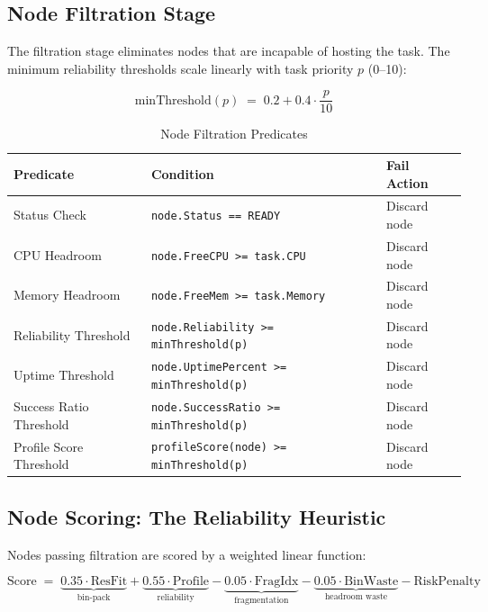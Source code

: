 \documentclass[11pt,a4paper]{article}
\begin{document}
\subsection{Node Filtration Stage}

The filtration stage eliminates nodes that are incapable of hosting the task. The minimum
reliability thresholds scale linearly with task priority $p$ (0--10):

\[
  \text{minThreshold}(p) \;=\; 0.2 + 0.4 \cdot \frac{p}{10}
\]

\begin{table}[H]
\centering
\caption{Node Filtration Predicates}
\label{tab:filtration}
\begin{tabular}{@{} l l l @{}}
\toprule
\textbf{Predicate}       & \textbf{Condition}                              & \textbf{Fail Action} \\
\midrule
Status Check             & \texttt{node.Status == READY}                   & Discard node \\
CPU Headroom             & \texttt{node.FreeCPU >= task.CPU}               & Discard node \\
Memory Headroom          & \texttt{node.FreeMem >= task.Memory}            & Discard node \\
Reliability Threshold    & \texttt{node.Reliability >= minThreshold(p)}    & Discard node \\
Uptime Threshold         & \texttt{node.UptimePercent >= minThreshold(p)}  & Discard node \\
Success Ratio Threshold  & \texttt{node.SuccessRatio >= minThreshold(p)}   & Discard node \\
Profile Score Threshold  & \texttt{profileScore(node) >= minThreshold(p)}  & Discard node \\
\bottomrule
\end{tabular}
\end{table}

\subsection{Node Scoring: The Reliability Heuristic}

Nodes passing filtration are scored by a weighted linear function:

\[
  \text{Score} \;=\;
    \underbrace{0.35 \cdot \text{ResFit}}_{\text{bin-pack}}
  + \underbrace{0.55 \cdot \text{Profile}}_{\text{reliability}}
  - \underbrace{0.05 \cdot \text{FragIdx}}_{\text{fragmentation}}
  - \underbrace{0.05 \cdot \text{BinWaste}}_{\text{headroom waste}}
  - \text{RiskPenalty}
\]
\end{document}
